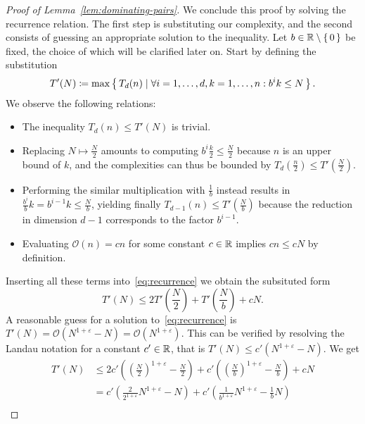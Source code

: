 \begin{proof}[Proof of Lemma~\ref{lem:dominating-pairs}]
    We conclude this proof by solving the recurrence relation.
    The first step is substituting our complexity, and the second consists of guessing an appropriate solution to the inequality.
    Let $b \in \mathbb{R} \setminus \left\{\,0\,\right\}$ be fixed, the choice of which will be clarified later on.
    Start by defining the substitution
    \[
        T'(N) \coloneqq \max \left\{\,T_d(n)\mid\forall i = 1, \dots, d, k = 1, \dots, n: b^i k \leq N\,\right\}.
    \]
    We observe the following relations:
    \begin{itemize}
        \item The inequality $T_d(n) \leq T'(N)$ is trivial.
        \item Replacing $N \mapsto \frac{N}{2}$ amounts to computing $b^i \frac{k}{2} \leq \frac{N}{2}$ because $n$ is an upper bound of $k$, and the complexities can thus be bounded by $T_d\left( \frac{n}{2} \right) \leq T'\left( \frac{N}{2} \right)$.
        \item Performing the similar multiplication with $\frac{1}{b}$ instead results in $\frac{b^i}{b} k = b^{i - 1} k \leq \frac{N}{b}$, yielding finally $T_{d - 1}(n) \leq T'\left( \frac{N}{b} \right)$ because the reduction in dimension $d - 1$ corresponds to the factor $b^{i - 1}$.
        \item Evaluating $\mathcal{O}(n) = c n$ for some constant $c \in \mathbb{R}$ implies $c n \leq c N$ by definition.
    \end{itemize}
    Inserting all these terms into~\ref{eq:recurrence} we obtain the subsituted form
    \begin{equation}
        T'(N) \leq 2 T'\left( \frac{N}{2} \right) + T'\left( \frac{N}{b} \right) + c N.
    \end{equation}
    A reasonable guess for a solution to~\ref{eq:recurrence} is $T'(N) = \mathcal{O}\left( N^{1 + \varepsilon} - N \right) = \mathcal{O}\left( N^{1 + \varepsilon} \right)$.
    This can be verified by resolving the Landau notation for a constant $c' \in \mathbb{R}$, that is $T'(N) \leq c' \left( N^{1 + \varepsilon} - N \right)$.
    We get
    \begin{align*}
        T'(N) &\leq 2 c' \left( {\left( \frac{N}{2} \right)}^{1 + \varepsilon} - \frac{N}{2} \right) + c' \left( {\left( \frac{N}{b} \right)}^{1 + \varepsilon} - \frac{N}{b} \right) + c N \\
         &= c' \left( \frac{2}{2^{1 + \varepsilon}} N^{1 + \varepsilon} - N \right) + c' \left( \frac{1}{b^{1 + \varepsilon}} N^{1 + \varepsilon} - \frac{1}{b} N \right) \\

\end{align*}
\end{proof}
